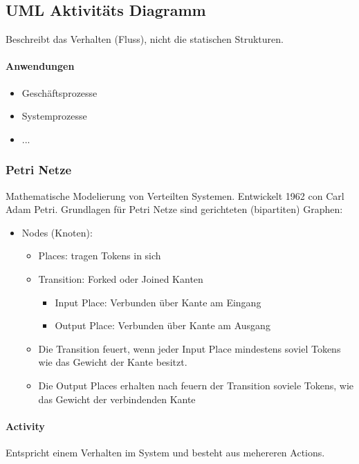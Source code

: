 \subsection{UML Aktivitäts Diagramm}
Beschreibt das Verhalten (Fluss), nicht die statischen Strukturen.

\paragraph{Anwendungen}

\begin{itemize}
\item Geschäftsprozesse
\item Systemprozesse
\item ...
\end{itemize}

\subsubsection{Petri Netze}
Mathematische Modelierung von Verteilten Systemen. Entwickelt 1962 con Carl Adam Petri. Grundlagen für Petri Netze sind gerichteten (bipartiten) Graphen:
\begin{itemize}
\item
{
Nodes (Knoten):
\begin{itemize}
\item Places: tragen Tokens in sich
\item
{
Transition: Forked oder Joined Kanten
\begin{itemize}
\item Input Place: Verbunden über Kante am Eingang
\item Output Place: Verbunden über Kante am Ausgang
\end{itemize}
}
\item Die Transition feuert, wenn jeder Input Place mindestens soviel Tokens wie das Gewicht der Kante besitzt.
\item Die Output Places erhalten nach feuern der Transition soviele Tokens, wie das Gewicht der verbindenden Kante
\end{itemize}
}
\end{itemize}


\newpage

\paragraph{Activity}
Entspricht einem Verhalten im System und besteht aus mehereren Actions.

